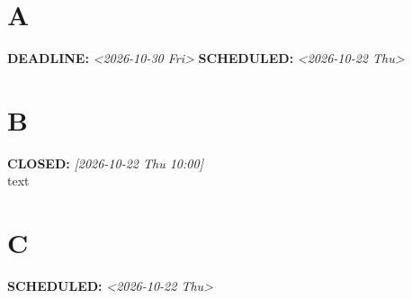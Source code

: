 \documentclass[11pt]{article}
\author{root}
\date{\today}
\title{}
\begin{document}
\tableofcontents

\section{A}
\label{sec:org1d5a17a}
\noindent\textbf{DEADLINE:} \textit{<2026-10-30 Fri> } \textbf{SCHEDULED:} \textit{<2026-10-22 Thu>}\\[0pt]
\section{B}
\label{sec:org76c527f}
\noindent\textbf{CLOSED:} \textit{[2026-10-22 Thu 10:00]}\\[0pt]
text
\section{C}
\label{sec:org94590d0}
\noindent\textbf{SCHEDULED:} \textit{<2026-10-22 Thu>}\\[0pt]
\end{document}
